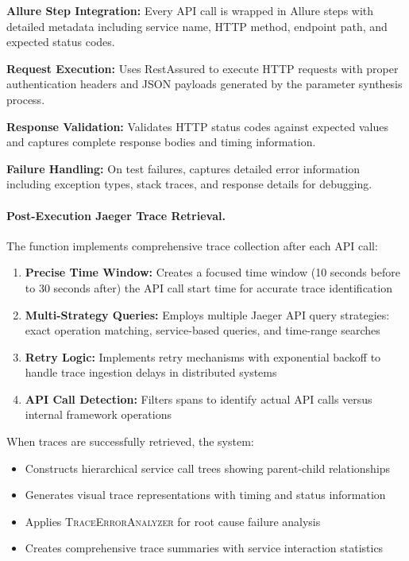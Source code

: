 \documentclass[conference]{IEEEtran}
\begin{document}
\textbf{Allure Step Integration:} Every API call is wrapped in Allure steps with detailed metadata including service name, HTTP method, endpoint path, and expected status codes.

\textbf{Request Execution:} Uses RestAssured to execute HTTP requests with proper authentication headers and JSON payloads generated by the parameter synthesis process.

\textbf{Response Validation:} Validates HTTP status codes against expected values and captures complete response bodies and timing information.

\textbf{Failure Handling:} On test failures, captures detailed error information including exception types, stack traces, and response details for debugging.

\paragraph{Post-Execution Jaeger Trace Retrieval.}
The  function implements comprehensive trace collection after each API call:

\begin{enumerate}[leftmargin=*]
  \item \textbf{Precise Time Window:} Creates a focused time window (10 seconds before
        to 30 seconds after) the API call start time for accurate trace identification
  \item \textbf{Multi-Strategy Queries:} Employs multiple Jaeger API query strategies:
        exact operation matching, service-based queries, and time-range searches
  \item \textbf{Retry Logic:} Implements retry mechanisms with exponential backoff
        to handle trace ingestion delays in distributed systems
  \item \textbf{API Call Detection:} Filters spans to identify actual API calls
        versus internal framework operations
\end{enumerate}

When traces are successfully retrieved, the system:
\begin{itemize}[leftmargin=*]
  \item Constructs hierarchical service call trees showing parent-child relationships
  \item Generates visual trace representations with timing and status information
  \item Applies \textsc{TraceErrorAnalyzer} for root cause failure analysis
  \item Creates comprehensive trace summaries with service interaction statistics
\end{itemize}
\end{document}
